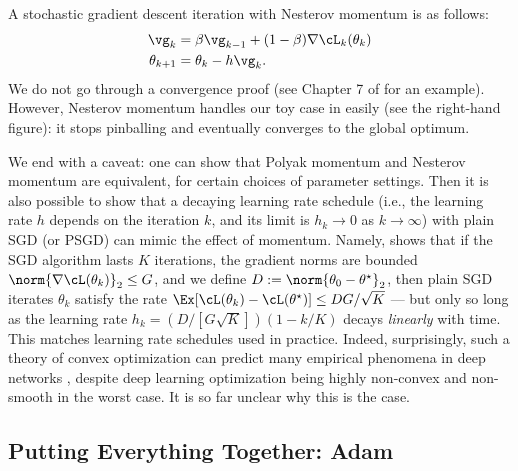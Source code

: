 \documentclass[../../book-main.tex]{subfiles}
\begin{document}
A stochastic gradient descent iteration with Nesterov momentum is as follows:
\begin{align}
    \vg_{k}
    &= \beta\vg_{k - 1} + (1 - \beta)\nabla \cL_{k}(\theta_{k}) \\ 
    \theta_{k + 1}
    &= \theta_{k} - h\vg_{k}.
\end{align}
We do not go through a convergence proof (see Chapter 7 of \cite{garrigos2023handbook} for an example). However, Nesterov momentum handles our toy case in  easily (see the right-hand figure): it stops pinballing and eventually converges to the global optimum.

We end with a caveat: one can show that Polyak momentum and Nesterov momentum are equivalent, for certain choices of parameter settings. Then it is also possible to show that a decaying learning rate schedule (i.e., the learning rate \(h\) depends on the iteration \(k\), and its limit is \(h_{k} \to 0\) as \(k \to \infty\)) with plain SGD (or PSGD) can mimic the effect of momentum. Namely, \cite{defazio2023optimal} shows that if the SGD algorithm lasts \(K\) iterations, the gradient norms are bounded \(\norm{\nabla \cL(\theta_{k})}_{2} \leq G\), and we define \(D := \norm{\theta_{0} - \theta^{\star}}_{2}\), then plain SGD iterates \(\theta_{k}\) satisfy the rate \(\Ex[\cL(\theta_{k}) - \cL(\theta^{\star})] \leq DG/\sqrt{K}\) --- but only so long as the learning rate \(h_{k} = (D/[G\sqrt{K}])(1 - k/K)\) decays \textit{linearly} with time. This matches learning rate schedules used in practice. Indeed, surprisingly, such a theory of convex optimization can predict many empirical phenomena in deep networks \cite{schaipp2025surprising}, despite deep learning optimization being highly non-convex and non-smooth in the worst case. It is so far unclear why this is the case.


\subsection{Putting Everything Together: Adam}
\end{document}
